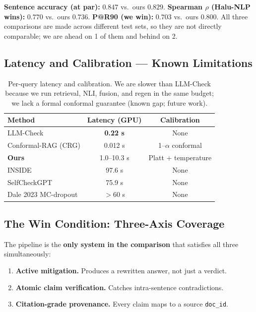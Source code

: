 \textbf{Sentence accuracy (at par):} $0.847$ vs.\ ours $0.829$. \textbf{Spearman $\rho$ (Halu-NLP wins):} $0.770$ vs.\ ours $0.736$. \textbf{P@R90 (we win):} $0.703$ vs.\ ours $0.800$. All three comparisons are made across different test sets, so they are not directly comparable; we are ahead on 1 of them and behind on 2.

\subsection{Latency and Calibration --- Known Limitations}
\label{sec:limitations-summary}

\begin{table}[ht]
\centering
\small
\begin{tabular}{lcc}
\hline
\textbf{Method} & \textbf{Latency (GPU)} & \textbf{Calibration} \\
\hline
LLM-Check & \textbf{0.22 s} & None \\
Conformal-RAG (CRG) & 0.012 s & 1--$\alpha$ conformal \\
\textbf{Ours} & 1.0--10.3 s & Platt + temperature \\
INSIDE & 97.6 s & None \\
SelfCheckGPT & 75.9 s & None \\
Dale 2023 MC-dropout & $>$60 s & None \\
\hline
\end{tabular}
\caption{Per-query latency and calibration. We are slower than LLM-Check
because we run retrieval, NLI, fusion, and regen in the same budget; we lack
a formal conformal guarantee (known gap; future work).}
\label{tab:latency-cal}
\end{table}

\subsection{The Win Condition: Three-Axis Coverage}
\label{sec:win-condition}

The pipeline is the \textbf{only system in the comparison} that satisfies
all three simultaneously:

\begin{enumerate}
    \item \textbf{Active mitigation.}
          Produces a rewritten answer, not just a verdict.
    \item \textbf{Atomic claim verification.}
          Catches intra-sentence contradictions.
    \item \textbf{Citation-grade provenance.}
          Every claim maps to a source \texttt{doc\_id}.
\end{enumerate}

